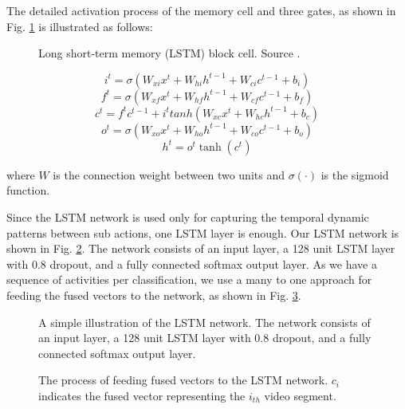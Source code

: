 The detailed activation process of the memory cell and three gates, as shown in Fig. \ref{fi:lstmblock} is
illustrated as follows:


\begin{figure}
  \centering
  
  \caption{Long short-term memory (LSTM) block cell. Source \cite{Graves2008supervised}.}\label{fi:lstmblock}
\end{figure}

\begin{equation}
i^{t} = \sigma (W_{xi}x^t + W_{hi}h^{t-1} + W_{ci}c^{t-1} + b_{i})
\end{equation}
\begin{equation}
f^{t} = \sigma (W_{xf}x^t + W_{hf}h^{t-1} + W_{cf}c^{t-1} + b_{f})
\end{equation}
\begin{equation}
c^{t} = f^tc^{t-1} + i^ttanh(W_{xc}x^t + W_{hc}h^{t-1} + b_{c})
\end{equation}
\begin{equation}
o^{t} = \sigma (W_{xo}x^t + W_{ho}h^{t-1} + W_{co}c^{t-1} + b_{o})
\end{equation}
\begin{equation}
h^t = o^t\tanh(c^t)
\end{equation}

where $W$ is the connection weight between two units and $\sigma(\cdot)$ is the sigmoid function.

Since the LSTM network is used only for capturing the temporal dynamic patterns between sub actions, one LSTM layer is enough.
Our LSTM network is shown in Fig. \ref{fi:layers}. The network consists of an input layer, a 128 unit LSTM layer with 0.8 dropout, and
a fully connected softmax output layer. As we have a sequence of activities per classification, we use a many to one approach
for feeding the fused vectors to the network, as shown in Fig. \ref{fi:lstm}.

\begin{figure}
  \centering
  
  \caption{A simple illustration of the LSTM network. The network consists of an input layer, a 128 unit LSTM layer with 0.8 dropout, and
a fully connected softmax output layer.}\label{fi:layers}
\end{figure}

\begin{figure}
  \centering
  
  \caption{The process of feeding fused vectors to the LSTM network. $c_{i}$ indicates the fused vector representing the $i_{th}$
  video segment.}\label{fi:lstm}
\end{figure}



